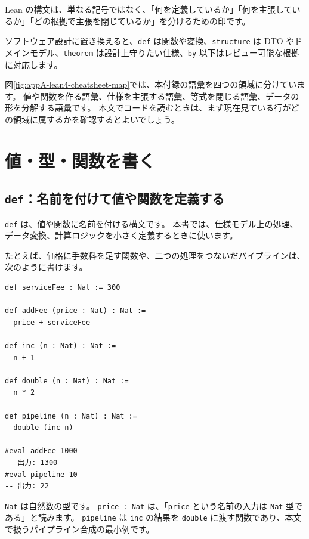 Lean の構文は、単なる記号ではなく、「何を定義しているか」「何を主張しているか」「どの根拠で主張を閉じているか」を分けるための印です。

ソフトウェア設計に置き換えると、\texttt{def} は関数や変換、\texttt{structure} は DTO やドメインモデル、\texttt{theorem} は設計上守りたい仕様、\texttt{by} 以下はレビュー可能な根拠に対応します。


図\ref{fig:appA-lean4-cheatsheet-map}では、本付録の語彙を四つの領域に分けています。
値や関数を作る語彙、仕様を主張する語彙、等式を閉じる語彙、データの形を分解する語彙です。
本文でコードを読むときは、まず現在見ている行がどの領域に属するかを確認するとよいでしょう。

\section{値・型・関数を書く}

\subsection{\texttt{def}：名前を付けて値や関数を定義する}

\texttt{def} は、値や関数に名前を付ける構文です。
本書では、仕様モデル上の処理、データ変換、計算ロジックを小さく定義するときに使います。

たとえば、価格に手数料を足す関数や、二つの処理をつないだパイプラインは、次のように書けます。

\begin{listing}[htbp]
\begin{verbatim}
def serviceFee : Nat := 300

def addFee (price : Nat) : Nat :=
  price + serviceFee

def inc (n : Nat) : Nat :=
  n + 1

def double (n : Nat) : Nat :=
  n * 2

def pipeline (n : Nat) : Nat :=
  double (inc n)

#eval addFee 1000
-- 出力: 1300
#eval pipeline 10
-- 出力: 22
\end{verbatim}
\caption{\texttt{serviceFee}・\texttt{addFee}・\texttt{pipeline}}
\label{lst:appA_def}
\end{listing}

\texttt{Nat} は自然数の型です。
\texttt{price : Nat} は、「\texttt{price} という名前の入力は \texttt{Nat} 型である」と読みます。
\texttt{pipeline} は \texttt{inc} の結果を \texttt{double} に渡す関数であり、本文で扱うパイプライン合成の最小例です。

